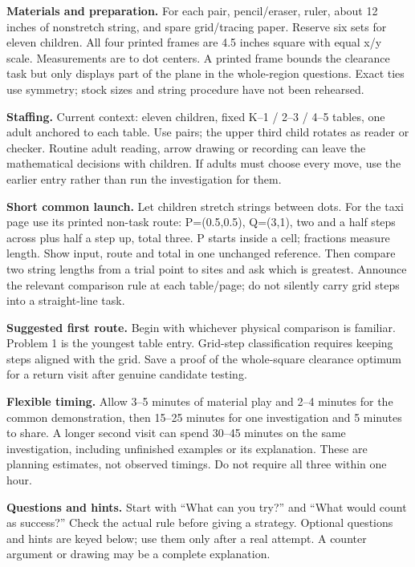 \documentclass[11pt]{article}
\begin{document}
\textbf{Materials and preparation.} For each pair, pencil/eraser, ruler, about 12 inches of nonstretch string, and spare grid/tracing paper. Reserve six sets for eleven children. All four printed frames are 4.5 inches square with equal x/y scale. Measurements are to dot centers. A printed frame bounds the clearance task but only displays part of the plane in the whole-region questions. Exact ties use symmetry; stock sizes and string procedure have not been rehearsed.

\textbf{Staffing.} Current context: eleven children, fixed K--1 / 2--3 / 4--5 tables, one adult anchored to each table. Use pairs; the upper third child rotates as reader or checker. Routine adult reading, arrow drawing or recording can leave the mathematical decisions with children. If adults must choose every move, use the earlier entry rather than run the investigation for them.

\textbf{Short common launch.} Let children stretch strings between dots. For the taxi page use its printed non-task route: P=(0.5,0.5), Q=(3,1), two and a half steps across plus half a step up, total three. P starts inside a cell; fractions measure length. Show input, route and total in one unchanged reference. Then compare two string lengths from a trial point to sites and ask which is greatest. Announce the relevant comparison rule at each table/page; do not silently carry grid steps into a straight-line task.

\textbf{Suggested first route.} Begin with whichever physical comparison is familiar. Problem 1 is the youngest table entry. Grid-step classification requires keeping steps aligned with the grid. Save a proof of the whole-square clearance optimum for a return visit after genuine candidate testing.

\textbf{Flexible timing.} Allow 3--5 minutes of material play and 2--4 minutes for the common demonstration, then 15--25 minutes for one investigation and 5 minutes to share. A longer second visit can spend 30--45 minutes on the same investigation, including unfinished examples or its explanation. These are planning estimates, not observed timings. Do not require all three within one hour.

\textbf{Questions and hints.} Start with ``What can you try?'' and ``What would count as success?'' Check the actual rule before giving a strategy. Optional questions and hints are keyed below; use them only after a real attempt. A counter argument or drawing may be a complete explanation.
\end{document}
